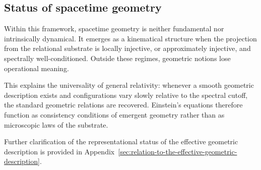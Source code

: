 \subsection{Status of spacetime geometry}
  \label{subsec:status-of-spacetime-geometry}

  Within this framework, spacetime geometry is neither fundamental
  nor intrinsically dynamical.
  It emerges as a kinematical structure when the projection from the
  relational substrate is locally injective, or approximately injective,
  and spectrally well-conditioned.
  Outside these regimes, geometric notions lose operational meaning.

  This explains the universality of general relativity:
  whenever a smooth geometric description exists and configurations
  vary slowly relative to the spectral cutoff,
  the standard geometric relations are recovered.
  Einstein’s equations therefore function as consistency conditions
  of emergent geometry rather than as microscopic laws of the substrate.

  Further clarification of the representational status of the effective
  geometric description is provided in
  Appendix~\ref{sec:relation-to-the-effective-geometric-description}.
